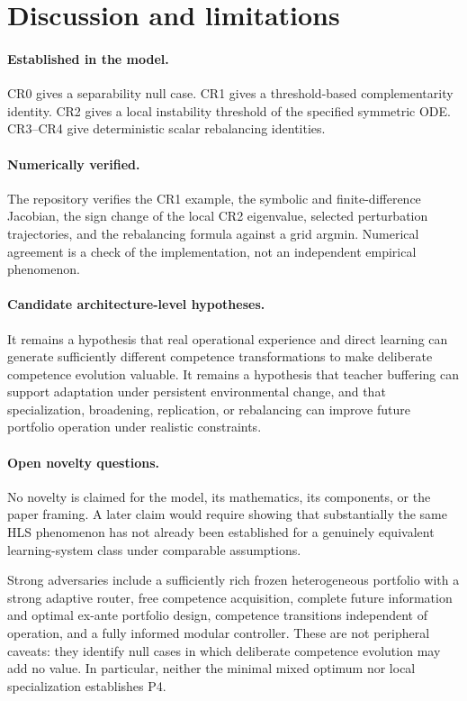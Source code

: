 \section{Discussion and limitations}

\paragraph{Established in the model.} CR0 gives a separability null case. CR1 gives a threshold-based complementarity identity. CR2 gives a local instability threshold of the specified symmetric ODE. CR3--CR4 give deterministic scalar rebalancing identities.

\paragraph{Numerically verified.} The repository verifies the CR1 example, the symbolic and finite-difference Jacobian, the sign change of the local CR2 eigenvalue, selected perturbation trajectories, and the rebalancing formula against a grid argmin. Numerical agreement is a check of the implementation, not an independent empirical phenomenon.

\paragraph{Candidate architecture-level hypotheses.} It remains a hypothesis that real operational experience and direct learning can generate sufficiently different competence transformations to make deliberate competence evolution valuable. It remains a hypothesis that teacher buffering can support adaptation under persistent environmental change, and that specialization, broadening, replication, or rebalancing can improve future portfolio operation under realistic constraints.

\paragraph{Open novelty questions.} No novelty is claimed for the model, its mathematics, its components, or the paper framing. A later claim would require showing that substantially the same HLS phenomenon has not already been established for a genuinely equivalent learning-system class under comparable assumptions.

Strong adversaries include a sufficiently rich frozen heterogeneous portfolio with a strong adaptive router, free competence acquisition, complete future information and optimal ex-ante portfolio design, competence transitions independent of operation, and a fully informed modular controller. These are not peripheral caveats: they identify null cases in which deliberate competence evolution may add no value. In particular, neither the minimal mixed optimum nor local specialization establishes P4.

